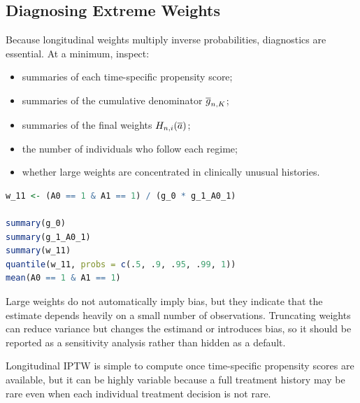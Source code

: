 \subsection{Diagnosing Extreme Weights}

Because longitudinal weights multiply inverse probabilities, diagnostics are
essential. At a minimum, inspect:
\begin{itemize}
  \item summaries of each time-specific propensity score;
  \item summaries of the cumulative denominator $\overline{g}_{n,K}$;
  \item summaries of the final weights $H_{n,i}(\overline{a})$;
  \item the number of individuals who follow each regime;
  \item whether large weights are concentrated in clinically unusual histories.
\end{itemize}

\begin{lstlisting}[language=R]
w_11 <- (A0 == 1 & A1 == 1) / (g_0 * g_1_A0_1)

summary(g_0)
summary(g_1_A0_1)
summary(w_11)
quantile(w_11, probs = c(.5, .9, .95, .99, 1))
mean(A0 == 1 & A1 == 1)
\end{lstlisting}

Large weights do not automatically imply bias, but they indicate that the
estimate depends heavily on a small number of observations. Truncating weights
can reduce variance but changes the estimand or introduces bias, so it should be
reported as a sensitivity analysis rather than hidden as a default.

\begin{keyidea}
Longitudinal IPTW is simple to compute once time-specific propensity scores are
available, but it can be highly variable because a full treatment history may be
rare even when each individual treatment decision is not rare.
\end{keyidea}
